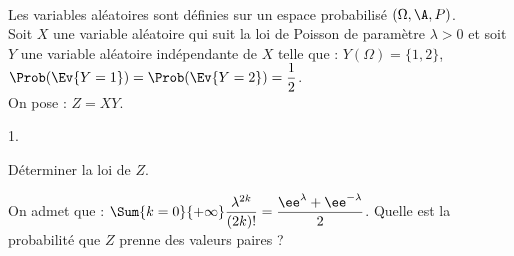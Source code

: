 \documentclass[11pt]{article}%
\begin{document}
\begin{exerciceSP}~\\
  Les variables aléatoires sont définies sur un espace probabilisé
  $(\Omega,\A,P)$.\\
  Soit $X$ une variable aléatoire qui suit la loi de Poisson de
  paramètre $\lambda>0$ et soit $Y$ une variable aléatoire
  indépendante de $X$ telle que : $Y(\Omega)=\{1,2\}$,
  $\Prob(\Ev{Y=1})=\Prob(\Ev{Y=2})=\dfrac{1}{2}$.\\
  On pose : $Z=XY$.
  \begin{noliste}{1.}
    \setlength{\itemsep}{2mm}
  \item Déterminer la loi de $Z$.
  \item On admet que : $\Sum{k=0}{+\infty}
    \dfrac{\lambda^{2k}}{(2k)!}=\dfrac{\ee^{\lambda}+\ee^{-\lambda}}{2}$. Quelle
    est la probabilité que $Z$ prenne des valeurs paires ?
  \end{noliste}
\end{exerciceSP}


\newpage
\end{document}
